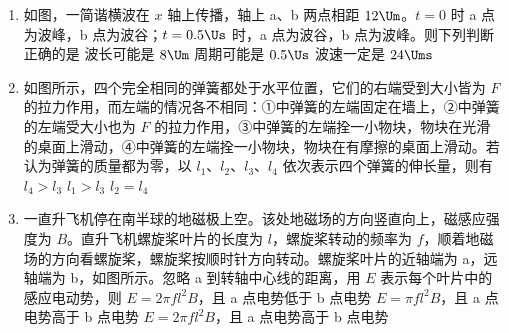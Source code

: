 \documentclass[\gkver]{gaokaozhenti}
\begin{document}
\begin{enumerate}
\item
如图，一简谐横波在 $x$ 轴上传播，轴上 a、b 两点相距 $12\Um$。$t=0$ 时 a 点为波峰，b 点为波谷；$t=0.5\Us$ 时，a 点为波谷，b 点为波峰。则下列判断正确的是
\onepicture[w=3.99cm]{}
{波长可能是 $8\Um$}
{周期可能是 $0.5\Us$}
{波速一定是 $24\Ums$}


\item
如图所示，四个完全相同的弹簧都处于水平位置，它们的右端受到大小皆为 $F$ 的拉力作用，而左端的情况各不相同：①中弹簧的左端固定在墙上，②中弹簧的左端受大小也为 $F$ 的拉力作用，③中弹簧的左端拴一小物块，物块在光滑的桌面上滑动，④中弹簧的左端拴一小物块，物块在有摩擦的桌面上滑动。若认为弹簧的质量都为零，以 $l_{1}$、$l_{2}$、$l_{3}$、$l_{4}$ 依次表示四个弹簧的伸长量，则有
\onepicture[w=12.00cm]{}
{$l_{4}>l_{3}$}
{$l_{1}>l_{3}$}
{$l_{2}=l_{4}$}


\item
一直升飞机停在南半球的地磁极上空。该处地磁场的方向竖直向上，磁感应强度为 $B$。直升飞机螺旋桨叶片的长度为 $l$，螺旋桨转动的频率为 $f$，顺着地磁场的方向看螺旋桨，螺旋桨按顺时针方向转动。螺旋桨叶片的近轴端为 a，远轴端为 b，如图所示。忽略 a 到转轴中心线的距离，用 $E$ 表示每个叶片中的感应电动势，则
\onepicture[w=4.22cm]{}
{$E=2\pi fl^{2}B$，且 a 点电势低于 b 点电势}
{$E=\pi fl^{2}B$，且 a 点电势高于 b 点电势}
{$E=2\pi fl^{2}B$，且 a 点电势高于 b 点电势}


\end{enumerate}
\end{document}
